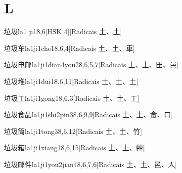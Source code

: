 
\section*{L}

\begin{entry}{垃圾}{la1 ji1}{8,6}[HSK 4][Radicais ⼟、⼟]
\end{entry}

\begin{entry}{垃圾车}{la1ji1che1}{8,6,4}[Radicais ⼟、⼟、⾞]
\end{entry}

\begin{entry}{垃圾电邮}{la1ji1dian4you2}{8,6,5,7}[Radicais ⼟、⼟、⽥、⾢]
\end{entry}

\begin{entry}{垃圾堆}{la1ji1dui1}{8,6,11}[Radicais ⼟、⼟、⼟]
\end{entry}

\begin{entry}{垃圾工}{la1ji1gong1}{8,6,3}[Radicais ⼟、⼟、⼯]
\end{entry}

\begin{entry}{垃圾食品}{la1ji1shi2pin3}{8,6,9,9}[Radicais ⼟、⼟、⾷、⼝]
\end{entry}

\begin{entry}{垃圾筒}{la1ji1tong3}{8,6,12}[Radicais ⼟、⼟、⽵]
\end{entry}

\begin{entry}{垃圾箱}{la1ji1xiang1}{8,6,15}[Radicais ⼟、⼟、⾋]
\end{entry}

\begin{entry}{垃圾邮件}{la1ji1you2jian4}{8,6,7,6}[Radicais ⼟、⼟、⾢、⼈]
\end{entry}

